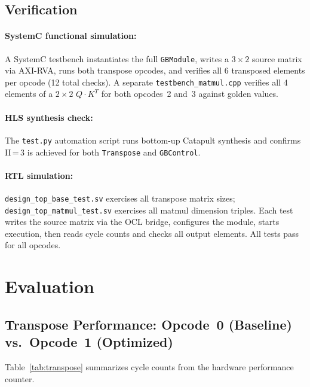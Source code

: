 \documentclass[11pt]{article}
\begin{document}
\subsection{Verification}

\paragraph{SystemC functional simulation:}
A SystemC testbench instantiates the full \texttt{GBModule}, writes a
$3\!\times\!2$ source matrix via AXI-RVA, runs both transpose opcodes, and
verifies all 6 transposed elements per opcode (12 total checks). A separate \texttt{testbench\_matmul.cpp} verifies all 4 elements of a $2\!\times\!2$ $Q\!\cdot\!K^T$ for both opcodes~2 and~3 against golden values.

\paragraph{HLS synthesis check:}
The \texttt{test.py} automation script runs bottom-up Catapult synthesis and confirms II\,=\,3 is achieved for both \texttt{Transpose} and
\texttt{GBControl}.

\paragraph{RTL simulation:}
\texttt{design\_top\_base\_test.sv} exercises all transpose matrix sizes; \texttt{design\_top\_matmul\_test.sv} exercises all matmul dimension triples. Each test writes the source matrix via the OCL bridge, configures the module, starts execution, then reads cycle counts and
checks all output elements. All tests pass for all opcodes.

\section{Evaluation}
\label{sec:evaluation}

\subsection{Transpose Performance: Opcode~0 (Baseline) vs.\ Opcode~1 (Optimized)}

Table~\ref{tab:transpose} summarizes cycle counts from the hardware performance counter. 
\end{document}
